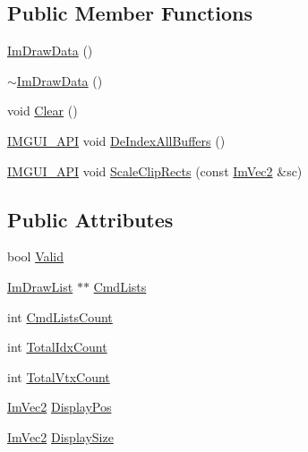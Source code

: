\subsection*{Public Member Functions}
\begin{DoxyCompactItemize}
\item 
\mbox{\hyperlink{struct_im_draw_data_a96b50c40107c997e9eea7ac3ba1a6138}{Im\+Draw\+Data}} ()
\item 
\mbox{\hyperlink{struct_im_draw_data_a2a4d7fdfbd0ae04c093bfdd53285f762}{$\sim$\+Im\+Draw\+Data}} ()
\item 
void \mbox{\hyperlink{struct_im_draw_data_ab6a90612bd22eaff0d42539875e2e5c9}{Clear}} ()
\item 
\mbox{\hyperlink{imgui_8h_a43829975e84e45d1149597467a14bbf5}{I\+M\+G\+U\+I\+\_\+\+A\+PI}} void \mbox{\hyperlink{struct_im_draw_data_a88ae746e958b79ee527fe94dee29d57c}{De\+Index\+All\+Buffers}} ()
\item 
\mbox{\hyperlink{imgui_8h_a43829975e84e45d1149597467a14bbf5}{I\+M\+G\+U\+I\+\_\+\+A\+PI}} void \mbox{\hyperlink{struct_im_draw_data_abbfb7f8351b436da654f93b6f103f0e2}{Scale\+Clip\+Rects}} (const \mbox{\hyperlink{struct_im_vec2}{Im\+Vec2}} \&sc)
\end{DoxyCompactItemize}
\subsection*{Public Attributes}
\begin{DoxyCompactItemize}
\item 
bool \mbox{\hyperlink{struct_im_draw_data_ad01ab9ce5e8843b7860ccbb3eb9a6554}{Valid}}
\item 
\mbox{\hyperlink{struct_im_draw_list}{Im\+Draw\+List}} $\ast$$\ast$ \mbox{\hyperlink{struct_im_draw_data_a9e93fe7e620eb2e9f61e3b689d617edc}{Cmd\+Lists}}
\item 
int \mbox{\hyperlink{struct_im_draw_data_adc0bbc2881c15f78bdabe51d82582f4e}{Cmd\+Lists\+Count}}
\item 
int \mbox{\hyperlink{struct_im_draw_data_a1ac8a5d441f464628295ef91a0602fc5}{Total\+Idx\+Count}}
\item 
int \mbox{\hyperlink{struct_im_draw_data_af0035b52cdf91932b25eaf2da853965a}{Total\+Vtx\+Count}}
\item 
\mbox{\hyperlink{struct_im_vec2}{Im\+Vec2}} \mbox{\hyperlink{struct_im_draw_data_a1e7755e98f5e24b1f4d9152766e6346e}{Display\+Pos}}
\item 
\mbox{\hyperlink{struct_im_vec2}{Im\+Vec2}} \mbox{\hyperlink{struct_im_draw_data_a74d53447c8882a3ce6dc7aaa3e081f39}{Display\+Size}}
\end{DoxyCompactItemize}



